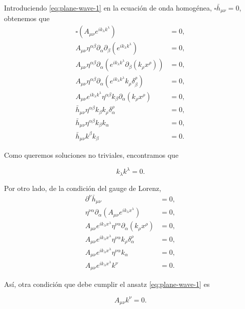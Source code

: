 \documentclass[letterpaper,11pt]{article}
\begin{document}
Introduciendo \eqref{eq:plane-wave-1} en la ecuación de onda homogénea, $\square \bar{h}_{\mu\nu} = 0$, obtenemos que
\begin{align}
\square\left( 
A_{\mu\nu} e^{ik_{\lambda} k^{\lambda}}\right) &= 0, \\
A_{\mu\nu} \eta^{\alpha\beta} \partial_{\alpha} \partial_{\beta} \left( 
 e^{ik_{\lambda} k^{\lambda}}\right) &= 0, \\
A_{\mu\nu} \eta^{\alpha\beta} \partial_{\alpha} \left( 
 e^{ik_{\lambda} k^{\lambda}} \partial_{\beta}(k_{\rho} x^{\rho})\right) &= 0, \\
A_{\mu\nu} \eta^{\alpha\beta} \partial_{\alpha} \left( 
 e^{ik_{\lambda} k^{\lambda}} k_{\rho} \delta_{\beta}^{\rho}\right) &= 0,\\
 A_{\mu\nu} e^{ik_{\lambda} k^{\lambda}} \eta^{\alpha\beta} k_{\beta} \partial_{\alpha} (k_{\rho} x^{\rho}) &= 0, \\
\bar{h}_{\mu\nu} \eta^{\alpha\beta} k_{\beta} k_{\rho} \delta_{\alpha}^{\rho} &= 0, \\
\bar{h}_{\mu\nu} \eta^{\alpha\beta} k_{\beta} k_{\alpha} &= 0, \\
\bar{h}_{\mu\nu} k^{\beta} k_{\beta} &= 0.
\end{align}

Como queremos soluciones no triviales, encontramos que
\begin{shaded}
\begin{equation}
k_{\lambda} k^{\lambda} = 0. \label{eq:plane-wave-3}
\end{equation}
\end{shaded}

Por otro lado, de la condición del gauge de Lorenz, 
\begin{align}
\partial^{\nu} \bar{h}_{\mu\nu} &= 0, \\
\eta^{\nu\alpha}\partial_{\alpha} \left(A_{\mu\nu} e^{ik_{\lambda} x^{\lambda}} \right) &= 0, \\
A_{\mu\nu} e^{ik_{\lambda} x^{\lambda}} \eta^{\nu\alpha} \partial_{\alpha}(k_{\rho} x^{\rho}) &= 0, \\
A_{\mu\nu} e^{ik_{\lambda} x^{\lambda}} \eta^{\nu\alpha} k_{\rho} \delta_{\alpha}^{\rho} &= 0, \\
A_{\mu\nu} e^{ik_{\lambda} x^{\lambda}} \eta^{\nu\alpha} k_{\alpha} &= 0,\\
A_{\mu\nu} e^{ik_{\lambda} x^{\lambda}} k^{\nu} &= 0.
\end{align}

Así, otra condición que debe cumplir el ansatz \eqref{eq:plane-wave-1} es
\begin{shaded}
\begin{equation}
A_{\mu\nu} k^{\nu} = 0. \label{eq:plane-wave-4}
\end{equation}
\end{shaded}
\end{document}
